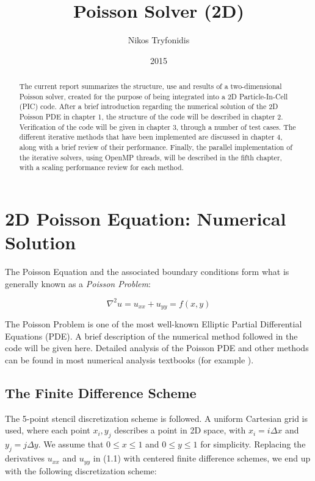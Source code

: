 \documentclass[11pt]{report}
\begin{document}
\title{\textbf{Poisson Solver (2D)}}
\author{Nikos Tryfonidis}
\date{2015}

\maketitle

\begin{abstract}
The current report summarizes the structure, use and results of a two-dimensional Poisson solver, 
created for the purpose of being integrated into a 2D Particle-In-Cell (PIC) code. After a brief introduction 
regarding the numerical solution of the 2D Poisson PDE in chapter 1, the structure of the code will be 
described in chapter 2. Verification of the code will be given in chapter 3, through a number of test cases. 
The different iterative methods that have been implemented are discussed in chapter 4, along with a brief review of their performance. Finally, the parallel implementation of the iterative solvers, using OpenMP threads, will be described in the fifth chapter, with a scaling performance review for each method.
\end{abstract}

\tableofcontents

\chapter{2D Poisson Equation: Numerical Solution}
The Poisson Equation and the associated boundary conditions form what is generally known as a 
\emph{Poisson Problem}: 

\begin{equation}
\nabla ^2 u = u_{xx} + u_{yy} = f(x,y)
\end{equation}

The Poisson Problem is one of the most well-known Elliptic Partial Differential Equations (PDE). A brief description of the numerical method followed in the code will be given here. Detailed analysis of the Poisson PDE and other methods can be found in most numerical analysis textbooks (for example \cite{leveque}).

\section{The Finite Difference Scheme}
The 5-point stencil discretization scheme is followed. A uniform Cartesian grid is used, where each point $x_i, y_j$ describes a point in 2D space, with $x_i = i\Delta x$ and $y_j = j\Delta y$. We assume that $0 \leq x \leq 1$ and $0 \leq y \leq 1$ for simplicity. Replacing the derivatives $u_{xx}$ and $u_{yy}$ in (1.1) with centered finite difference schemes, we end up with the following discretization scheme:
\end{document}
